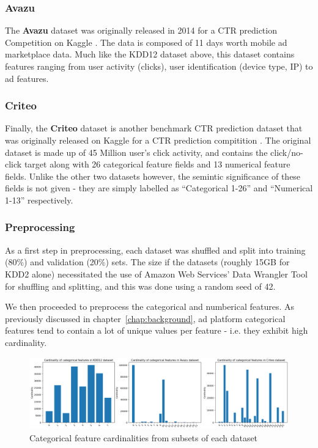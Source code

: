 \documentclass{mldsmsc}
\begin{document}
\subsubsection{Avazu}

The \textbf{Avazu} dataset was originally released in 2014 for a CTR prediction 
Competition on Kaggle \citep{RefWorks:wang2014click-through}. The data is 
composed of 11 days worth mobile ad marketplace data. Much like the KDD12 
dataset above, this dataset contains features ranging from user activity 
(clicks), user identification (device type, IP) to ad features.

\subsubsection{Criteo}

Finally, the \textbf{Criteo} dataset is another benchmark CTR prediction dataset 
that was originally released on Kaggle for a CTR prediction compitition \citep{RefWorks:tien2014display}. 
The original dataset is made up of 45 Million user's click activity, and 
contains the click/no-click target along with 26 categorical feature 
fields and 13 numerical feature fields. Unlike the other two datasets 
however, the semintic significance of these fields is not given - they 
are simply labelled as ``Categorical 1-26'' and ``Numerical 1-13'' 
respectively.

\subsubsection{Preprocessing}

As a first step in preprocessing, each dataset was shuffled and split into training (80\%) and validation (20\%)
sets. The size if the datasets (roughly 15GB for KDD2 alone) necessitated the use of Amazon Web Services'
Data Wrangler Tool \citep{AWSDataWrangler} for shuffling and splitting, and this was done using a random seed of 42.

We then proceeded to preprocess the categorical and numberical features. As previously
discussed in chapter~\ref{chap:background}, ad platform categorical features tend to contain
a lot of unique values per feature - i.e. they exhibit high cardinality.

\begin{figure}[h]
    \centering
    \includegraphics[width=\textwidth]{../figures/dataset_cardinalities.png}
    \caption{Categorical feature cardinalities from subsets of each dataset}
    \label{fig:cardinalities}
\end{figure}
\end{document}
